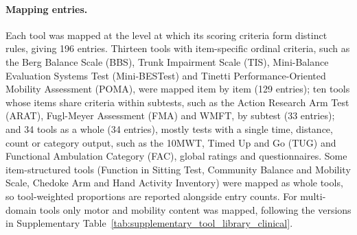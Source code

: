 \documentclass[11pt]{article}
\begin{document}
\paragraph{Mapping entries.} Each tool was mapped at the level at which its scoring criteria form distinct rules, giving 196 entries. Thirteen tools with item-specific ordinal criteria, such as the Berg Balance Scale (BBS), Trunk Impairment Scale (TIS), Mini-Balance Evaluation Systems Test (Mini-BESTest) and Tinetti Performance-Oriented Mobility Assessment (POMA), were mapped item by item (129 entries); ten tools whose items share criteria within subtests, such as the Action Research Arm Test (ARAT), Fugl-Meyer Assessment (FMA) and WMFT, by subtest (33 entries); and 34 tools as a whole (34 entries), mostly tests with a single time, distance, count or category output, such as the 10MWT, Timed Up and Go (TUG) and Functional Ambulation Category (FAC), global ratings and questionnaires. Some item-structured tools (Function in Sitting Test, Community Balance and Mobility Scale, Chedoke Arm and Hand Activity Inventory) were mapped as whole tools, so tool-weighted proportions are reported alongside entry counts. For multi-domain tools only motor and mobility content was mapped, following the versions in Supplementary Table~\ref{tab:supplementary_tool_library_clinical}.
\end{document}
